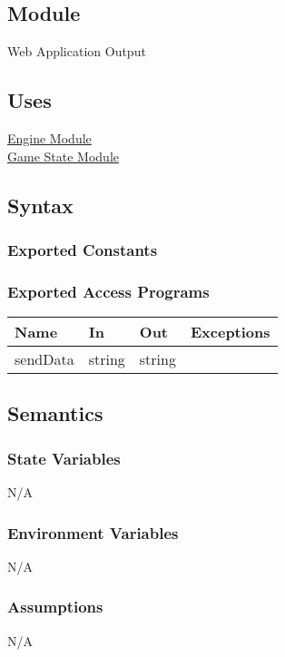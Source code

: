 \documentclass[12pt, titlepage]{article}
\begin{document}
    \subsection{Module}
    Web Application Output

    \subsection{Uses}
    \hyperref[mEngine]{Engine Module}\\
    \hyperref[mGame]{Game State Module}

    \subsection{Syntax}
    \subsubsection{Exported Constants}

    \subsubsection{Exported Access Programs}
        \begin{center}
        \begin{tabular}{p{4.5cm} p{4cm} p{3cm} p{2.5cm}}
        \hline
        \textbf{Name} & \textbf{In} & \textbf{Out} & \textbf{Exceptions} \\
        \hline
        sendData & string & string & \\
        \hline
        \end{tabular}
        \end{center}

    \subsection{Semantics}
    \subsubsection{State Variables}
    N/A

    \subsubsection{Environment Variables}
    N/A

    \subsubsection{Assumptions}
    N/A
\end{document}
